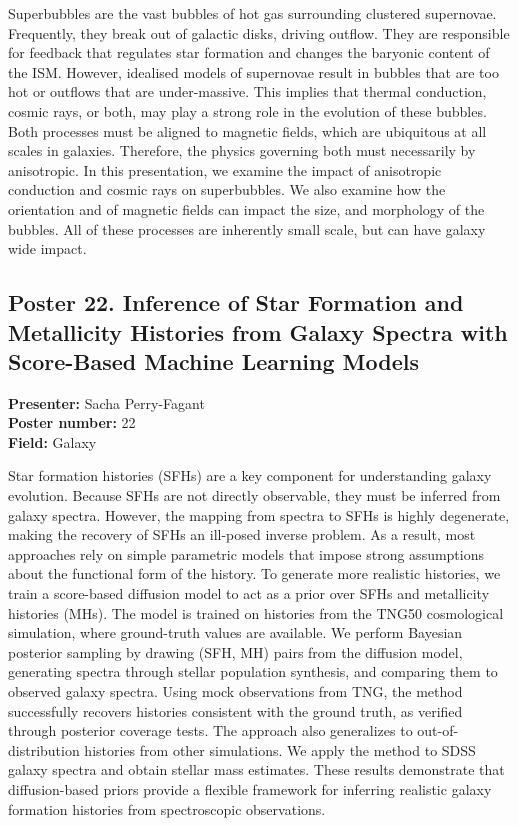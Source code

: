 Superbubbles are the vast bubbles of hot gas surrounding clustered supernovae. Frequently, they break out of galactic disks, driving outflow. They are responsible for feedback that regulates star formation and changes the baryonic content of the ISM. However, idealised models of supernovae result in bubbles that are too hot or outflows that are under-massive. This implies that thermal conduction, cosmic rays, or both, may play a strong role in the evolution of these bubbles. Both processes must be aligned to magnetic fields, which are ubiquitous at all scales in galaxies. Therefore, the physics governing both must necessarily by anisotropic. In this presentation, we examine the impact of anisotropic conduction and cosmic rays on superbubbles. We also examine how the orientation and of magnetic fields can impact the size, and morphology of the bubbles. All of these processes are inherently small scale, but can have galaxy wide impact.

\hypertarget{poster-abstract-talk-216}{}\label{poster-abstract-page-talk-216}
\subsection*{Poster 22. Inference of Star Formation and Metallicity Histories from Galaxy Spectra with Score-Based Machine Learning Models}
\textbf{Presenter:} Sacha Perry-Fagant\\
\textbf{Poster number:} 22\\
\textbf{Field:} Galaxy

Star formation histories (SFHs) are a key component for understanding galaxy evolution. Because SFHs are not directly observable, they must be inferred from galaxy spectra. However, the mapping from spectra to SFHs is highly degenerate, making the recovery of SFHs an ill-posed inverse problem. As a result, most approaches rely on simple parametric models that impose strong assumptions about the functional form of the history. To generate more realistic histories, we train a score-based diffusion model to act as a prior over SFHs and metallicity histories (MHs). The model is trained on histories from the TNG50 cosmological simulation, where ground-truth values are available. We perform Bayesian posterior sampling by drawing (SFH, MH) pairs from the diffusion model, generating spectra through stellar population synthesis, and comparing them to observed galaxy spectra. Using mock observations from TNG, the method successfully recovers histories consistent with the ground truth, as verified through posterior coverage tests. The approach also generalizes to out-of-distribution histories from other simulations. We apply the method to SDSS galaxy spectra and obtain stellar mass estimates. These results demonstrate that diffusion-based priors provide a flexible framework for inferring realistic galaxy formation histories from spectroscopic observations.

